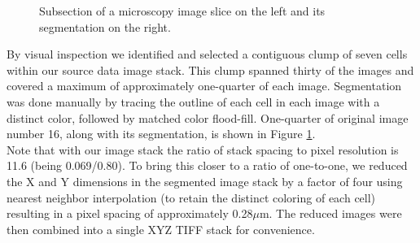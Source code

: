 \documentclass[a4paper,10pt]{article}
\begin{document}
\begin{figure}[H]
\begin{center}
\hspace{0.5cm}
\end{center}
\caption{Subsection of a microscopy image slice on the left and its segmentation on the right.}
\label{fig:slice}
\end{figure}

By visual inspection we identified and selected a contiguous clump of seven cells within our source data image stack.  This clump spanned thirty of the images and covered a maximum of approximately one-quarter of each image. Segmentation was done manually by tracing the outline of each cell in each image with a distinct color, followed by matched color flood-fill. One-quarter of original image number 16, along with its segmentation, is shown in Figure \ref{fig:slice}.\\

Note that with our image stack the ratio of stack spacing to pixel resolution is 11.6 (being 0.069/0.80). To bring this closer to a ratio of one-to-one, we reduced the X and Y dimensions in the segmented image stack by a factor of four using nearest neighbor interpolation (to retain the distinct coloring of each cell) resulting in a pixel spacing of approximately 0.28$\mu$m.  The reduced images were then combined into a single XYZ TIFF stack for convenience.\\
\end{document}
